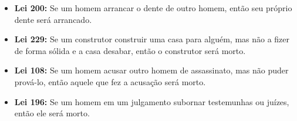 \begin{multicols}{2}
\begin{itemize}
	\item \textbf{Lei 200:}
		\subitem Se um homem arrancar o dente de outro homem, então seu próprio dente será arrancado.
		
		\vfill\null
		\columnbreak

	\item \textbf{Lei 229:}
		\subitem Se um construtor construir uma casa para alguém, mas não a fizer de forma sólida e a casa desabar, então o construtor será morto.
	
	\item \textbf{Lei 108:}
		\subitem Se um homem acusar outro homem de assassinato, mas não puder prová-lo, então aquele que fez a acusação será morto.

	
	\item \textbf{Lei 196:}
		\subitem Se um homem em um julgamento subornar testemunhas ou juízes, então ele será morto.

\end{itemize}

\end{multicols}

\vfill
\pagebreak

